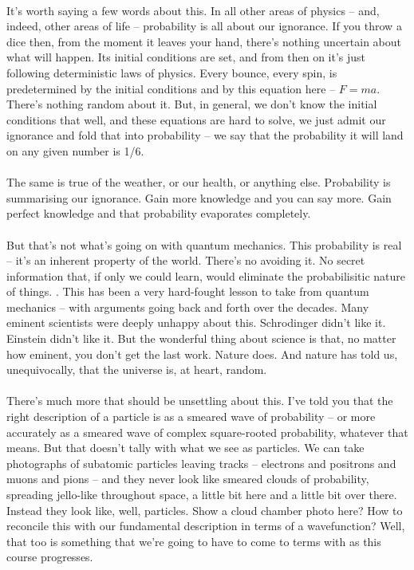\documentclass[12pt]{article}
\newcommand\para{\paragraph{}}
\begin{document}
\para
It's worth saying a few words about this. In all other areas of physics -- and, indeed, other areas of life  -- probability is all about our ignorance. If you throw a dice then, from the moment it leaves your hand, there's nothing uncertain about what will happen. Its initial conditions are set, and from then on it's just following deterministic laws of physics. Every bounce, every spin, is predetermined by the initial conditions and by this equation here -- $F=ma$. There's nothing random about it. But, in general, we don't know the initial conditions that well, and these equations are hard to solve, we just admit our ignorance and fold that into probability -- we say that the probability it will land on any given number is 1/6. 

\para
The same is true of the weather, or our health, or anything else. Probability is summarising our ignorance. Gain more knowledge and you can say more. Gain perfect knowledge and that probability evaporates completely. 
 
\para
But that's not what's going on with quantum mechanics. This probability is real -- it's an inherent property of the world. There's no avoiding it. No secret information that, if only we could learn, would eliminate the probabilisitic nature of things. . This has been a very hard-fought lesson to take from quantum mechanics -- with arguments going back and forth over the decades. Many eminent scientists were deeply unhappy about this. Schrodinger didn't like it. Einstein didn't like it. But the wonderful thing about science is that, no matter how eminent, you don't get the last work. Nature does. And nature has told us, unequivocally, that the universe is, at heart, random. 

\para
There's much more that should be unsettling about this. I've told you that the right description of a particle is as a smeared wave of probability -- or more accurately as a smeared wave of complex square-rooted probability, whatever that means. But that doesn't tally with what we see as particles. We can take photographs of subatomic particles leaving tracks -- electrons and positrons and muons and pions -- and they never look like smeared clouds of probability, spreading jello-like throughout space, a little bit here and a little bit over there. Instead they look like, well, particles. {\color{blue}Show a cloud chamber photo here?} How to reconcile this with our fundamental description in terms of a wavefunction? Well, that too is something that we're going to have to come to terms with as this course progresses.
\end{document}
